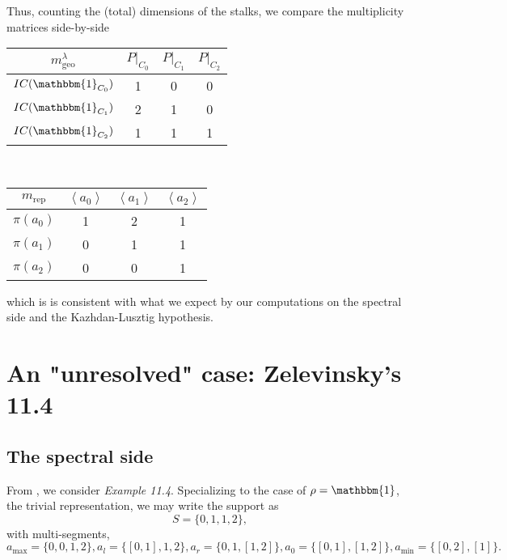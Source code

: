 \documentclass{memoir}
\newcommand{\la}{\left\langle}
\newcommand{\ra}{\right\rangle}
\newcommand{\tx}{\text}
\theoremstyle{definition}
\begin{document}
	Thus, counting the (total) dimensions of the stalks, we compare the multiplicity matrices side-by-side
	\begin{center}
		\begin{tabular}{c | c c c}
			$m_{\tx{geo}}^\lambda$ & $P|_{C_0}$ & $P|_{C_1}$ & $P|_{C_2}$ \\
			\hline
			$IC(\mathbbm{1}_{C_0})$ & 1 & 0 & 0 \\
			$IC(\mathbbm{1}_{C_1})$ & 2 & 1 & 0 \\
			$IC(\mathbbm{1}_{C_2})$ & 1 & 1 & 1
		\end{tabular} \ \ \ \ \ \ \ \ \begin{tabular}{ c | c c c }
			$m_{\tx{rep}}$ & $\la a_0\ra$ & $\la a_1\ra$ & $\la a_2\ra$ \\
			\hline 
			$\pi(a_0)$ & 1 & 2 & 1 \\
			$\pi(a_1)$ & 0 & 1 & 1 \\
			$\pi(a_2)$ & 0 & 0 & 1
		\end{tabular}
	\end{center}
	which is is consistent with what we expect by our computations on the spectral side and the Kazhdan-Lusztig hypothesis.  
	
	
	
	
	
	
	
	
	
	
	
	
	
	
	
	
	
	
	
	
	
	
	
	
	
	
	
	
	
	\section{An "unresolved" case: Zelevinsky's 11.4}
	
	\subsection{The spectral side}
	
	From \cite{ZelI2}, we consider \emph{Example 11.4}.  
	Specializing to the case of $\rho=\mathbbm{1}$, the trivial representation, we may write the support as 
	$$S=\{0, 1, 1, 2\},$$
	with multi-segments,
	$$a_{\tx{max}}=\{0, 0, 1, 2\}, a_l=\{[0, 1], 1, 2\}, a_r=\{0, 1, [1, 2]\}, a_0=\{[0, 1], [1, 2]\}, a_{\tx{min}}=\{[0, 2], [1]\}.$$
	
\end{document}
